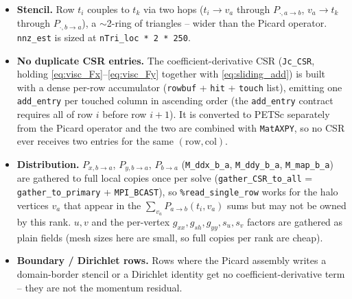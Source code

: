 \documentclass[11pt]{article}
\newcommand{\code}[1]{\texttt{#1}}
\newcommand{\ti}{t_i}
\newcommand{\tk}{t_k}
\newcommand{\va}{v_a}
\begin{document}
\begin{itemize}[leftmargin=1.4em]
\item \textbf{Stencil.} Row $\ti$ couples to $\tk$ via two hops ($\ti\to\va$
  through $P_{\cdot,a\to b}$, $\va\to\tk$ through $P_{\cdot,b\to a}$), a
  $\sim$2-ring of triangles -- wider than the Picard operator. \code{nnz\_\allowbreak est}
  is sized at \code{nTri\_\allowbreak loc * 2 * 250}.
\item \textbf{No duplicate CSR entries.} The coefficient-derivative CSR
  (\code{Jc\_\allowbreak CSR}, holding \eqref{eq:visc_Fx}--\eqref{eq:visc_Fy} together
  with \eqref{eq:sliding_add}) is built with a dense per-row accumulator
  (\code{rowbuf} + \code{hit} + \code{touch} list), emitting one
  \code{add\_\allowbreak entry} per touched column in ascending order (the
  \code{add\_\allowbreak entry} contract requires all of row $i$ before row $i+1$). It is
  converted to PETSc separately from the Picard operator and the two are
  combined with \code{MatAXPY}, so no CSR ever receives two entries for the
  same $(\text{row},\text{col})$.
\item \textbf{Distribution.} $P_{x,b\to a}$, $P_{y,b\to a}$, $P_{b\to a}$
  (\code{M\_\allowbreak ddx\_\allowbreak b\_\allowbreak a}, \code{M\_\allowbreak ddy\_\allowbreak b\_\allowbreak a}, \code{M\_\allowbreak map\_\allowbreak b\_\allowbreak a}) are gathered
  to full local copies once per solve (\code{gather\_\allowbreak CSR\_\allowbreak to\_\allowbreak all} =
  \code{gather\_\allowbreak to\_\allowbreak primary} + \code{MPI\_\allowbreak BCAST}), so
  \code{\%read\_\allowbreak single\_\allowbreak row} works for the halo vertices $\va$ that appear in
  the $\sum_{\va} P_{a\to b}(\ti,\va)$ sums but may not be owned by this rank.
  $u,v$ and the per-vertex $g_{xx},g_{sh},g_{yy},s_u,s_v$ factors are gathered
  as plain fields (mesh sizes here are small, so full copies per rank are
  cheap).
\item \textbf{Boundary / Dirichlet rows.} Rows where the Picard assembly
  writes a domain-border stencil or a Dirichlet identity get no
  coefficient-derivative term -- they are not the momentum residual.
\end{itemize}
\end{document}
